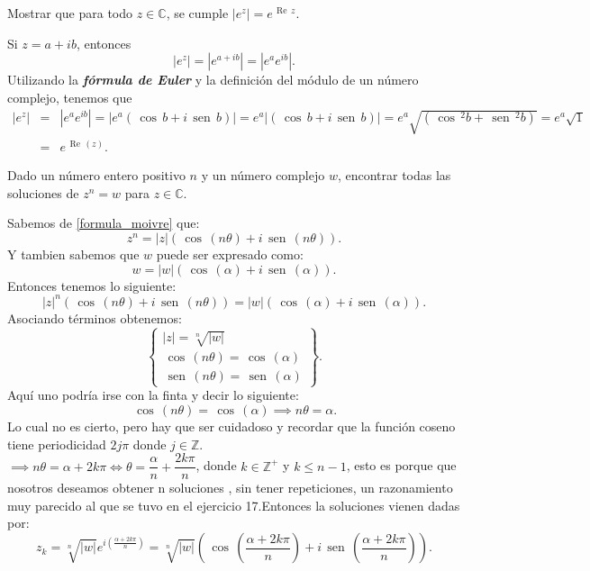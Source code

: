 \documentclass[twoside]{book}
\renewcommand{\sin}{\,\operatorname{sen}\,}
\renewcommand{\cos}{\,\operatorname{cos}\,}
\renewcommand{\Re}{\,\operatorname{Re}\,}
\renewcommand{\emph}[1]{\textbf{\textit{\textcolor{amber}{#1}}}}
\begin{document}
\begin{example}{}
    Mostrar que para todo $z\in\mathbb C$, se cumple $|e^{z}|=e^{\Re z}$.

\end{example}
\begin{sol}
    \begin{solucion}{}
        Si $z=a+ib$, entonces
        \[
            |e^{z}|=|e^{a+ib}|=|e^{a}e^{ib}|.
        \]
        Utilizando la \emph{f\'ormula de Euler} y la definici\'on del m\'odulo de un n\'umero complejo, tenemos que
        \begin{eqnarray*}
            |e^z|&=&|e^{a}e^{ib}|=|e^{a}(\cos b + i\sin b)| =e^{a}|(\cos b + i\sin b)|=e^{a}\sqrt{(\cos^{2} b + \sin^{2} b)}=e^{a}\sqrt{1}\\
            &=&e^{\Re (z)}.
        \end{eqnarray*}

    \end{solucion}
\end{sol}
\begin{example}{}
    Dado un n\'umero entero positivo $n$ y un n\'umero complejo $w$, encontrar todas las soluciones de $z^n=w$ para $z\in \mathbb C$.

\end{example}
\begin{sol}
    \begin{solucion}{}
        Sabemos de \eqref{formula_moivre} que:
        $$z^n=|z|\left(\cos(n\theta)+i\sin(n\theta)\right).$$
        Y tambien sabemos que $w$ puede ser expresado como:
        $$w=|w|\left(\cos(\alpha)+i\sin(\alpha)\right).$$
        Entonces tenemos lo siguiente:
        $$|z|^n\left(\cos(n\theta)+i\sin(n\theta)\right)=|w|\left(\cos(\alpha)+i\sin(\alpha)\right).$$
        Asociando t\'erminos obtenemos:
        \[
            \left\{\begin{array}{lr}
                |z|=\sqrt[n]{|w|}          \\
                \cos(n\theta)=\cos(\alpha) \\
                \sin(n\theta)=\sin(\alpha)
            \end{array}\right\}
            .\]
        Aqu\'i uno podr\'ia irse con la finta y decir lo siguiente:
        $$\cos(n\theta)=\cos(\alpha)\implies n\theta=\alpha.$$
        Lo cual no es cierto, pero hay que ser cuidadoso y recordar que la funci\'on coseno tiene periodicidad $2j\pi$ donde $j\in\mathbb{Z}.$\\
        $\implies n\theta=\alpha+2k\pi \iff \theta=\dfrac{\alpha}{n}+\dfrac{2k\pi}{n}$, donde $k\in\mathbb{Z}^+$ y $k\leq n-1$, esto es porque que nosotros deseamos obtener n soluciones , sin tener repeticiones, un razonamiento muy parecido al que se tuvo en el ejercicio 17.Entonces la soluciones vienen dadas por:
        $$\boxed{z_k=\sqrt[n]{|w|}e^{i(\frac{\alpha+2k\pi}{n})}=\sqrt[n]{|w|}\left(\cos\left(\dfrac{\alpha+2k\pi}{n}\right)+i\sin\left(\dfrac{\alpha+2k\pi}{n}\right)\right)}.$$

    \end{solucion}
\end{sol}
\end{document}
